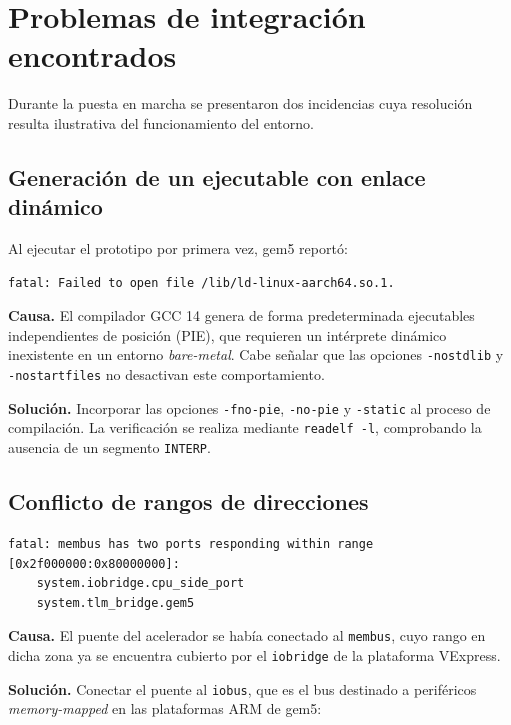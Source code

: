 \documentclass[11pt,letterpaper]{article}
\begin{document}
\section{Problemas de integración encontrados}

Durante la puesta en marcha se presentaron dos incidencias cuya resolución
resulta ilustrativa del funcionamiento del entorno.

\subsection{Generación de un ejecutable con enlace dinámico}

Al ejecutar el prototipo por primera vez, gem5 reportó:

\begin{lstlisting}[style=consola]
fatal: Failed to open file /lib/ld-linux-aarch64.so.1.
\end{lstlisting}

\textbf{Causa.} El compilador GCC 14 genera de forma predeterminada ejecutables
independientes de posición (PIE), que requieren un intérprete dinámico
inexistente en un entorno \emph{bare-metal}. Cabe señalar que las opciones
\texttt{-nostdlib} y \texttt{-nostartfiles} no desactivan este comportamiento.

\textbf{Solución.} Incorporar las opciones \texttt{-fno-pie}, \texttt{-no-pie} y
\texttt{-static} al proceso de compilación. La verificación se realiza mediante
\texttt{readelf -l}, comprobando la ausencia de un segmento \texttt{INTERP}.

\subsection{Conflicto de rangos de direcciones}

\begin{lstlisting}[style=consola]
fatal: membus has two ports responding within range [0x2f000000:0x80000000]:
	system.iobridge.cpu_side_port
	system.tlm_bridge.gem5
\end{lstlisting}

\textbf{Causa.} El puente del acelerador se había conectado al \texttt{membus},
cuyo rango en dicha zona ya se encuentra cubierto por el \texttt{iobridge} de la
plataforma VExpress.

\textbf{Solución.} Conectar el puente al \texttt{iobus}, que es el bus destinado
a periféricos \emph{memory-mapped} en las plataformas ARM de gem5:
\end{document}
